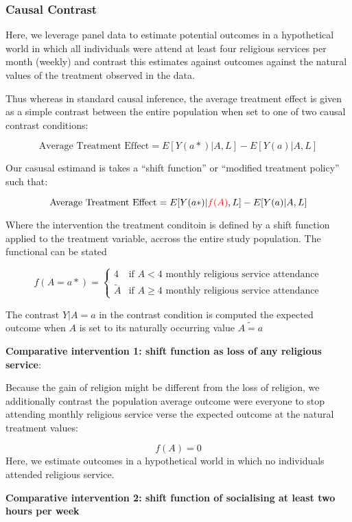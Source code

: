 \documentclass[
  singlecolumn]{article}
\begin{document}
\subsubsection{Causal Contrast}\label{causal-contrast}

Here, we leverage panel data to estimate potential outcomes in a
hypothetical world in which all individuals were attend at least four
religious services per month (weekly) and contrast this estimates
against outcomes against the natural values of the treatment observed in
the data.

Thus whereas in standard causal inference, the average treatment effect
is given as a simple contrast between the entire population when set to
one of two causal contrast conditions:

\[ \text{Average Treatment Effect} = E[Y(a*)|A,L] - E[Y(a)|A,L] \]

Our casusal estimand is takes a ``shift function'' or ``modified
treatment policy'' such that:

\[ \text{Average Treatment Effect} = E[Y(a*)|\textcolor{red}{f(A)},L] - E[Y(a)|A,L] \]

Where the intervention the treatment conditoin is defined by a shift
function applied to the treatment variable, accross the entire study
population. The functional can be stated

\[f(A = a*) = \begin{cases} 4 & \text{if } A < 4  \text{ monthly religious service attendance} \\ \tilde{A} & \text{if } A \geq 4  \text{ monthly religious service attendance} \end{cases} \]

The contrast \(Y|A=a\) in the contrast condition is computed the
expected outcome when \(A\) is set to its naturally occurring value
\(\tilde{A = a}\)

\textbf{Comparative intervention 1: shift function as loss of any
religious service}:

Because the gain of religion might be different from the loss of
religion, we additionally contrast the population average outcome were
everyone to stop attending monthly religious service verse the expected
outcome at the natural treatment values:

\[f(A) = 0 \] Here, we estimate outcomes in a hypothetical world in
which no individuals attended religious service.

\textbf{Comparative intervention 2: shift function of socialising at
least two hours per week}
\end{document}
